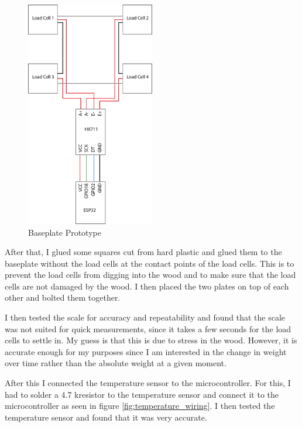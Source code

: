 \begin{figure}
    \centering
    \includegraphics[width=0.5\textwidth]{figures/loadcell_wiring.png}
    \caption{Baseplate Prototype}
    \label{fig:loadcell_wiring}
\end{figure}

After that, I glued some squares cut from hard plastic and glued them to the baseplate without the load cells at the contact points of the load cells. This is to prevent the load cells from digging into the wood and to make sure that the load cells are not damaged by the wood. I then placed the two plates on top of each other and bolted them together.

I then tested the scale for accuracy and repeatability and found that the scale was not suited for quick measurements, since it takes a few seconds for the load cells to settle in. My guess is that this is due to stress in the wood. However, it is accurate enough for my purposes since I am interested in the change in weight over time rather than the absolute weight at a given moment.

After this I connected the temperature sensor to the microcontroller. For this, I had to solder a 4.7 k\Omega resistor to the temperature sensor and connect it to the microcontroller as seen in figure \ref{fig:temperature_wiring}. I then tested the temperature sensor and found that it was very accurate.

